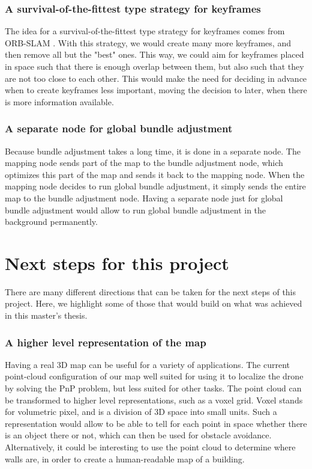 \subsubsection{A survival-of-the-fittest type strategy for keyframes}
The idea for a survival-of-the-fittest type strategy for keyframes comes from ORB-SLAM \cite{orbslam}. With this strategy, we would create many more keyframes, and then remove all but the "best" ones. This way, we could aim for keyframes placed in space such that there is enough overlap between them, but also such that they are not too close to each other. This would make the need for deciding in advance when to create keyframes less important, moving the decision to later, when there is more information available.

\subsubsection{A separate node for global bundle adjustment}
Because bundle adjustment takes a long time, it is done in a separate node. The mapping node sends part of the map to the bundle adjustment node, which optimizes this part of the map and sends it back to the mapping node. When the mapping node decides to run global bundle adjustment, it simply sends the entire map to the bundle adjustment node. Having a separate node just for global bundle adjustment would allow to run global bundle adjustment in the background permanently. 


\section{Next steps for this project}
There are many different directions that can be taken for the next steps of this project. Here, we highlight some of those that would build on what was achieved in this master's thesis.

\subsubsection{A higher level representation of the map}
Having a real 3D map can be useful for a variety of applications. The current point-cloud configuration of our map well suited for using it to localize the drone by solving the PnP problem, but less suited for other tasks. The point cloud can be transformed to higher level representations, such as a voxel grid. Voxel stands for volumetric pixel, and is a division of 3D space into small units. Such a representation would allow to be able to tell for each point in space whether there is an object there or not, which can then be used for obstacle avoidance. Alternatively, it could be interesting to use the point cloud to determine where walls are, in order to create a human-readable map of a building.\\


